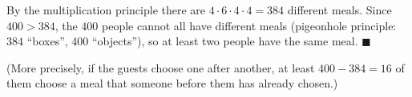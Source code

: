 By the multiplication principle there are $4\cdot6\cdot4\cdot4=384$ different meals. Since $400>384$, the $400$ people cannot all have different meals (pigeonhole principle: $384$ ``boxes'', $400$ ``objects''), so at least two people have the same meal. $\blacksquare$

(More precisely, if the guests choose one after another, at least $400-384=16$ of them choose a meal that someone before them has already chosen.)
